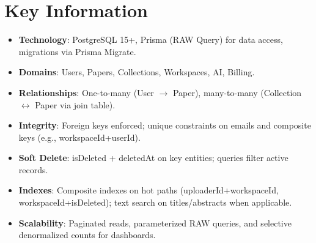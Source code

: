 \section*{Key Information}
\begin{itemize}[leftmargin=*,topsep=3pt,itemsep=2pt]
  \item \textbf{Technology}: PostgreSQL 15+, Prisma (RAW Query) for data access, migrations via Prisma Migrate.
  \item \textbf{Domains}: Users, Papers, Collections, Workspaces, AI, Billing.
  \item \textbf{Relationships}: One-to-many (User \texorpdfstring{$\rightarrow$}{->} Paper), many-to-many (Collection \texorpdfstring{$\leftrightarrow$}{<->} Paper via join table).
  \item \textbf{Integrity}: Foreign keys enforced; unique constraints on emails and composite keys (e.g., workspaceId+userId).
  \item \textbf{Soft Delete}: isDeleted + deletedAt on key entities; queries filter active records.
  \item \textbf{Indexes}: Composite indexes on hot paths (uploaderId+workspaceId, workspaceId+isDeleted); text search on titles/abstracts when applicable.
  \item \textbf{Scalability}: Paginated reads, parameterized RAW queries, and selective denormalized counts for dashboards.
\end{itemize}
